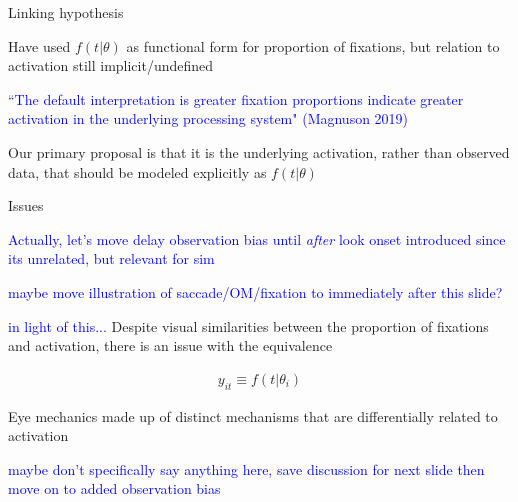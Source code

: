 \documentclass{beamer}
\newcommand{\vp}{\vspace{2mm}}
\providecommand{\cn}[1]{\textcolor{blue}{#1}}
\begin{document}
\begin{frame}{Linking hypothesis}\Large

Have used $f(t|\theta)$ as functional form for proportion of fixations, but relation to activation still implicit/undefined \vp

\cn{``The default interpretation is greater fixation proportions indicate greater activation in the underlying processing system" (Magnuson 2019)} \vp


Our primary proposal is that it is the underlying activation, rather than observed data, that should be modeled explicitly as $f(t|\theta)$ \vp


\end{frame}

\begin{frame}{Issues}

\cn{Actually, let's move delay observation bias until \textit{after} look onset introduced since its unrelated, but relevant for sim}

\cn{maybe move illustration of saccade/OM/fixation to immediately after this slide?}

\cn{in light of this...} Despite visual similarities between the proportion of fixations and activation, there is an issue with the equivalence

\begin{align*}
y_{it} \equiv f(t | \theta_i)
\end{align*}

Eye mechanics made up of distinct mechanisms that are differentially related to activation \vp

\cn{maybe don't specifically say anything here, save discussion for next slide then move on to added observation bias}

\end{frame}
\end{document}
